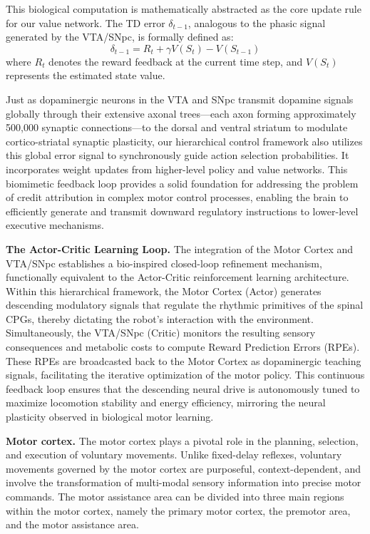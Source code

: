 \documentclass[lettersize,journal]{IEEEtran}
\begin{document}
This biological computation is mathematically abstracted as the core update rule for our value network. 
The TD error $\delta_{t-1}$, analogous to the phasic signal generated by the VTA/SNpc, is formally defined as:
\begin{equation}
    \delta_{t-1} = R_{t} + \gamma V(S_{t}) - V(S_{t-1})
\end{equation}
where $R_{t}$ denotes the reward feedback at the current time step, and $V(S_{t})$ represents the estimated state value.

Just as dopaminergic neurons in the VTA and SNpc transmit dopamine signals globally through their extensive axonal trees—each axon forming approximately 500,000 synaptic connections—to the dorsal and ventral striatum to modulate cortico-striatal synaptic plasticity, our hierarchical control framework also utilizes this global error signal to synchronously guide action selection probabilities.
It incorporates weight updates from higher-level policy and value networks. 
This biomimetic feedback loop provides a solid foundation for addressing the problem of credit attribution in complex motor control processes, enabling the brain to efficiently generate and transmit downward regulatory instructions to lower-level executive mechanisms.

\textbf{The Actor-Critic Learning Loop.}
The integration of the Motor Cortex and VTA/SNpc establishes a bio-inspired closed-loop refinement mechanism, functionally equivalent to the Actor-Critic reinforcement learning architecture. 
Within this hierarchical framework, the Motor Cortex (Actor) generates descending modulatory signals that regulate the rhythmic primitives of the spinal CPGs, thereby dictating the robot's interaction with the environment. 
Simultaneously, the VTA/SNpc (Critic) monitors the resulting sensory consequences and metabolic costs to compute Reward Prediction Errors (RPEs). 
These RPEs are broadcasted back to the Motor Cortex as dopaminergic teaching signals, facilitating the iterative optimization of the motor policy. 
This continuous feedback loop ensures that the descending neural drive is autonomously tuned to maximize locomotion stability and energy efficiency, mirroring the neural plasticity observed in biological motor learning.

\textbf{Motor cortex.}
The motor cortex plays a pivotal role in the planning, selection, and execution of voluntary movements. 
Unlike fixed-delay reflexes, voluntary movements governed by the motor cortex are purposeful, context-dependent, and involve the transformation of multi-modal sensory information into precise motor commands. 
The motor assistance area can be divided into three main regions within the motor cortex, namely the primary motor cortex, the premotor area, and the motor assistance area.
\end{document}
